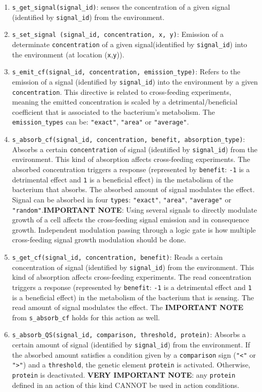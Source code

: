 \documentclass[10pt,a4paper]{article}
\begin{document}
\begin{enumerate}
	\item \texttt{s\_get\_signal(signal\_id)}: senses the concentration of a given signal (identified by \texttt{signal\_id}) from the environment.
	\item \texttt{s\_set\_signal (signal\_id, concentration, x, y)}: Emission of a determinate \texttt{concentration} of a given signal(identified by \texttt{signal\_id}) into the environment (at location (\texttt{x},\texttt{y})).
	\item \texttt{s\_emit\_cf(signal\_id, concentration, emission\_type)}: Refers to the emission of a signal (identified by \texttt{signal\_id}) into the environment by a given \texttt{concentration}. This directive is related to cross-feeding experiments, meaning the emitted concentration is scaled by a detrimental/beneficial coefficient that is associated to the bacterium’s metabolism. The \texttt{emission\_types} can be: \texttt{"{}exact"{}}, \texttt{"{}area"{}} or \texttt{"{}average"{}}.
	\item \texttt{s\_absorb\_cf(signal\_id, concentration, benefit, absorption\_type)}: Absorbs a certain \texttt{concentration} of signal (identified by \texttt{signal\_id}) from the environment. This kind of absorption affects cross-feeding experiments. The absorbed concentration triggers a response (represented by \texttt{benefit}: \texttt{-1} is a detrimental effect and \texttt{1} is a beneficial effect) in the metabolism of the bacterium that absorbs. The absorbed amount of signal modulates the effect. Signal can be absorbed in four \texttt{types}: \texttt{"{}exact"{}}, \texttt{"{}area"{}}, \texttt{"{}average"{}} or \texttt{"{}random"{}}.\textbf{IMPORTANT NOTE}: Using several signals to directly modulate growth of a cell affects the cross-feeding signal emission and in consequence growth. Independent modulation passing through a logic gate is how multiple cross-feeding signal growth modulation should be done. 
	\item \texttt{s\_get\_cf(signal\_id, concentration, benefit)}: Reads a certain concentration of signal (identified by \texttt{signal\_id}) from the environment. This kind of absorption affects cross-feeding experiments. The read concentration triggers a response (represented by  \texttt{benefit}: \texttt{-1} is a detrimental effect and \texttt{1} is a beneficial effect) in the metabolism of the bacterium that is sensing. The read amount of signal modulates the effect. The \textbf{IMPORTANT NOTE} from \texttt{s\_absorb\_cf} holds for this action as well.
	\item \texttt{s\_absorb\_QS(signal\_id, comparison, threshold, protein)}: Absorbs a certain amount of signal (identified by \texttt{signal\_id}) from the environment. If the absorbed amount satisfies a condition given by a \texttt{comparison} sign (\texttt{"{}<"{}} or \texttt{"{}>"{}}) and a \texttt{threshold}, the genetic element \texttt{protein} is activated. Otherwise, \texttt{protein} is deactivated. \textbf{VERY IMPORTANT NOTE}: any \texttt{protein} defined in an action of this kind CANNOT be used in action conditions.

\end{enumerate}
\end{document}
